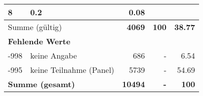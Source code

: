 \begin{longtable}{lXrrr}
       \num{8} &
       \num[round-mode=places,round-precision=2]{0.2} &
         \num[round-mode=places,round-precision=2]{0.08} \\
     \midrule
     \multicolumn{2}{l}{Summe (gültig)} &
       \textbf{\num{4069}} &
     \textbf{\num{100}} &
       \textbf{\num[round-mode=places,round-precision=2]{38.77}} \\
     \multicolumn{5}{l}{\textbf{Fehlende Werte}}\\
       -998 &
       keine Angabe &
         \num{686} &
        - &
         \num[round-mode=places,round-precision=2]{6.54} \\
       -995 &
       keine Teilnahme (Panel) &
         \num{5739} &
        - &
         \num[round-mode=places,round-precision=2]{54.69} \\
     \midrule
     \multicolumn{2}{l}{\textbf{Summe (gesamt)}} &
          \textbf{\num{10494}} &
        \textbf{-} &
        \textbf{\num{100}} \\
     \bottomrule
     \end{longtable}
     

